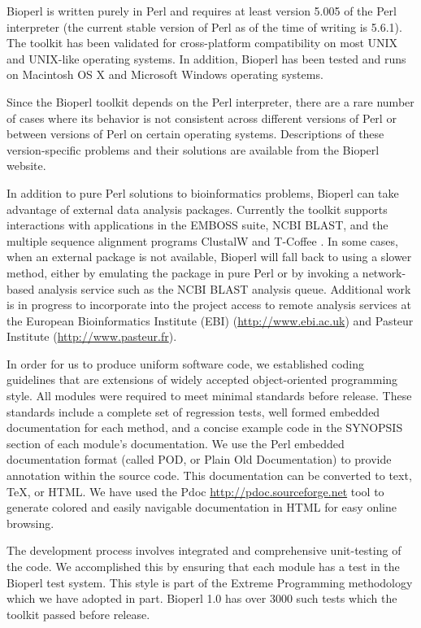 \documentclass[12pt]{article}
\begin{document}
Bioperl is written purely in Perl and requires at least version 5.005
of the Perl interpreter (the current stable version of Perl as of the
time of writing is 5.6.1).  The toolkit has been validated for
cross-platform compatibility on most UNIX and UNIX-like operating
systems.  In addition, Bioperl has been tested and runs on Macintosh
OS X and Microsoft Windows operating systems.  

Since the Bioperl toolkit depends on the Perl interpreter, there are a
rare number of cases where its behavior is not consistent across
different versions of Perl or between versions of Perl on certain
operating systems.  Descriptions of these version-specific problems
and their solutions are available from the Bioperl website.

In addition to pure Perl solutions to bioinformatics problems, Bioperl
can take advantage of external data analysis packages.  Currently the
toolkit supports interactions with applications in the EMBOSS
\cite{emboss} suite, NCBI BLAST, and the multiple sequence alignment
programs ClustalW \cite{clustalw} and T-Coffee \cite{tcoffee}.  In
some cases, when an external package is not available, Bioperl will
fall back to using a slower method, either by emulating the package in
pure Perl or by invoking a network-based analysis service such as the
NCBI BLAST analysis queue.  Additional work is in progress to
incorporate into the project access to remote analysis services at the
European Bioinformatics Institute (EBI) (\url{http://www.ebi.ac.uk}) and
Pasteur Institute (\url{http://www.pasteur.fr}).

In order for us to produce uniform software code, we established
coding guidelines that are extensions of widely accepted
object-oriented programming style.  All modules were required to meet
minimal standards before release.  These standards include a complete
set of regression tests, well formed embedded documentation for each
method, and a concise example code in the SYNOPSIS section of each
module's documentation.  We use the Perl embedded documentation format
(called POD, or Plain Old Documentation) to provide annotation within
the source code.  This documentation can be converted to text, TeX, or
HTML.  We have used the Pdoc \url{http://pdoc.sourceforge.net} tool to
generate colored and easily navigable documentation in HTML for easy
online browsing.

The development process involves integrated and comprehensive
unit-testing of the code.  We accomplished this by ensuring that each
module has a test in the Bioperl test system.  This style is part of
the Extreme Programming methodology \cite{xprogramming} which we have
adopted in part.  Bioperl 1.0 has over 3000 such tests which the toolkit
passed before release.
\end{document}
